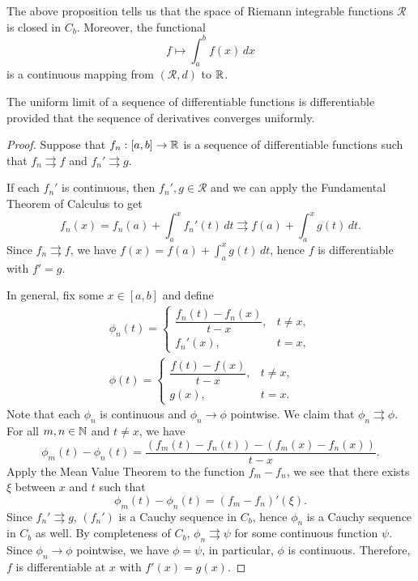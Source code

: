The above proposition tells us that the space of Riemann integrable functions $\mathcal R$ is closed in $C_b$. Moreover, the functional
\[
f \mapsto \int_a^b f(x) \, dx
\]
is a continuous mapping from $(\mathcal R, d)$ to ${\mathbb R}$.

\begin{prop}
    The uniform limit of a sequence of differentiable functions is differentiable provided that the sequence of derivatives converges uniformly.
    \begin{proof}
        Suppose that $f_n: [a, b] \to {\mathbb R}$ is a sequence of differentiable functions such that $f_n \rightrightarrows f$ and $f_n' \rightrightarrows g$. 

        If each $f_n'$ is continuous, then $f_n', g \in \mathcal R$ and we can apply the Fundamental Theorem of Calculus to get
        \[
        f_n(x) = f_n(a) + \int_a^x f_n'(t) \, dt \rightrightarrows f(a) + \int_a^x g(t) \, dt.
        \]
        Since $f_n \rightrightarrows f$, we have $f(x) = f(a) + \int_a^x g(t) \, dt$, hence $f$ is differentiable with $f' = g$.

        In general, fix some $x \in [a, b]$ and define
        \begin{gather*}
            \phi_n(t) = \begin{cases}
                \dfrac{f_n(t) - f_n(x)}{t - x}, & t \neq x, \\
                f_n'(x), & t = x,
            \end{cases} \\
            \phi(t) = \begin{cases}
                \dfrac{f(t) - f(x)}{t - x}, & t \neq x, \\
                g(x), & t = x.
            \end{cases}
        \end{gather*}
        Note that each $\phi_n$ is continuous and $\phi_n \to \phi$ pointwise. We claim that $\phi_n \rightrightarrows \phi$. For all $m, n \in {\mathbb N}$ and $t \neq x$, we have
        \[
        \phi_m(t) - \phi_n(t) = \frac{(f_m(t) - f_n(t)) - (f_m(x) - f_n(x))}{t - x}.
        \]
        Apply the Mean Value Theorem to the function $f_m - f_n$, we see that there exists $\xi$ between $x$ and $t$ such that
        \[
        \phi_m(t) - \phi_n(t) = (f_m - f_n)'(\xi).
        \]
        Since $f_n' \rightrightarrows g$, $(f_n')$ is a Cauchy sequence in $C_b$, hence $\phi_n$ is a Cauchy sequence in $C_b$ as well. By completeness of $C_b$, $\phi_n \rightrightarrows \psi$ for some continuous function $\psi$. Since $\phi_n \to \phi$ pointwise, we have $\phi = \psi$, in particular, $\phi$ is continuous. Therefore, $f$ is differentiable at $x$ with $f'(x) = g(x)$. 
    \end{proof}
\end{prop}

